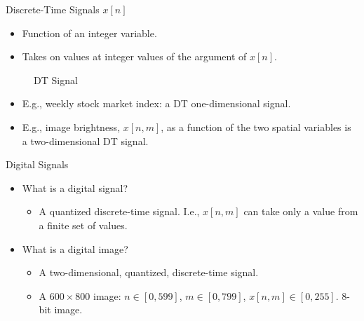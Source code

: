 
\begin{frame}[plain]{Discrete-Time Signals $x[n]$}
    \begin{itemize}
        \item Function of an integer variable.
        \item Takes on values at integer values of the argument of $x[n]$.
    \end{itemize}
    \begin{figure}
      \centering
      
      \caption{DT Signal}\label{fi:dt_signal}
    \end{figure}
    \begin{itemize}
        \item E.g., weekly stock market index: a DT one-dimensional signal.
        \item E.g., image brightness,  $x[n,m]$,  as a function of the two spatial variables is a two-dimensional DT signal.
    \end{itemize}
\end{frame}

\begin{frame}{Digital Signals}
    \begin{itemize}
      \item What is a digital signal?
        \begin{itemize}
            \item A quantized discrete-time signal. I.e., $x[n,m]$ can take only a value from a finite set of values.
        \end{itemize}

      \item What is a digital image?
        \begin{itemize}
            \item A two-dimensional, quantized, discrete-time signal.
            \item A $600 \times 800$ image: $n \in [0, 599]$, $m \in [0, 799]$, $x[n,m] \in [0,255]$. 8-bit image.
        \end{itemize}
    \end{itemize}
\end{frame}

